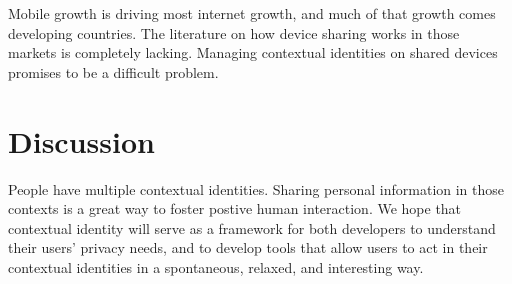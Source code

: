 \documentclass{llncs}
\begin{document}
Mobile growth is driving most internet growth, and much of that growth comes
developing countries. The literature on how device sharing works in those
markets is completely lacking. Managing contextual identities on shared devices
promises to be a difficult problem.

\section{Discussion}
People have multiple contextual identities. Sharing personal information in
those contexts is a great way to foster postive human interaction.  We hope
that contextual identity will serve as a framework for both developers to
understand their users' privacy needs, and to develop tools that allow users to
act in their contextual identities in a spontaneous, relaxed, and interesting
way.

\begin{comment}
papers:
expectation of privacy\cite{viegas}
http://jcmc.indiana.edu/vol10/issue3/viegas.html

danah boyd
making sense of privacy and publicity: whose voice counts? does your child's
teacher have a right to be public in her other roles online? does she have a
right to be secular? religious? friend? lover? if you work for company X and
you disagree with their policies, are you allowed to be public about
that:?\cite{boyd2}

close to you “stranger on a train” “stranger on a plane”
\end{comment}

\begin{comment}
\section{Acknowledgements}
The authors thank
Ben Adida
Ed Lee
Lucas Adamski
Mike Connor

\end{comment}



\end{document}
